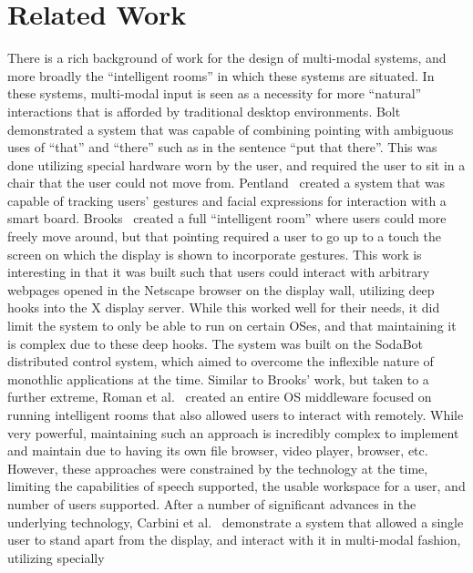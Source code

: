 \section{Related Work}\label{sec:cais_prior_work}

There is a rich background of work for the design of multi-modal systems, and 
more broadly the ``intelligent rooms'' in which these systems are situated. In
these systems, multi-modal input is seen as a necessity for more ``natural''
interactions that is afforded by traditional desktop environments.
Bolt~\cite{bolt_put-that-there:_1980} demonstrated a system that was capable
of combining pointing with ambiguous uses of ``that'' and ``there'' such as in
the sentence ``put that there''. This was done utilizing special hardware worn
by the user, and required the user to sit in a chair that the user could not
move from. Pentland~\cite{pentland_smart_1996} created a system that was
capable of tracking users' gestures and facial expressions for interaction
with a smart board. Brooks~\cite{brooks_intelligent_1997} created a full 
``intelligent room'' where users could more freely move around, but
that pointing required a user to go up to a touch the screen on which the
display is shown to incorporate gestures. This work is interesting in that
it was built such that users could interact with arbitrary webpages opened
in the Netscape browser on the display wall, utilizing deep hooks into the X
display server. While this worked well for their needs, it did limit the system
to only be able to run on certain OSes, and that maintaining it is complex due
to these deep hooks. The system was built on the
SodaBot~\cite{coen_sodabot:_1994} distributed control system, which aimed to 
overcome the inflexible nature of monothlic applications at the time. Similar
to Brooks' work, but taken to a further extreme, Roman et 
al.~\cite{roman_middleware_2002} created an entire OS middleware focused on running
intelligent rooms that also allowed users to interact with remotely. While very
powerful, maintaining such an approach is incredibly complex to implement and
maintain due to having its own file browser, video player, browser, etc.
However, these approaches were constrained by the technology at the time,
limiting the capabilities of speech supported, the usable workspace for a
user, and number of users supported. After a number of significant advances in 
the underlying technology, Carbini et al.~\cite{carbini_wizard_2006} 
demonstrate a system that allowed a single user to stand apart from the
display, and interact with it in multi-modal fashion, utilizing specially
